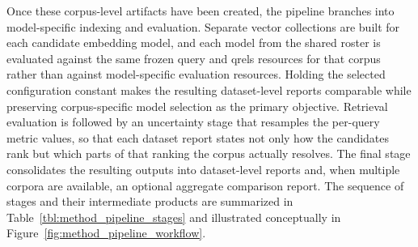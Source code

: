 Once these corpus-level artifacts have been created, the pipeline branches into model-specific indexing and evaluation. Separate vector collections are built for each candidate embedding model, and each model from the shared roster is evaluated against the same frozen query and qrels resources for that corpus rather than against model-specific evaluation resources. Holding the selected configuration constant makes the resulting dataset-level reports comparable while preserving corpus-specific model selection as the primary objective. Retrieval evaluation is followed by an uncertainty stage that resamples the per-query metric values, so that each dataset report states not only how the candidates rank but which parts of that ranking the corpus actually resolves. The final stage consolidates the resulting outputs into dataset-level reports and, when multiple corpora are available, an optional aggregate comparison report. The sequence of stages and their intermediate products are summarized in Table~\ref{tbl:method_pipeline_stages} and illustrated conceptually in Figure~\ref{fig:method_pipeline_workflow}.

